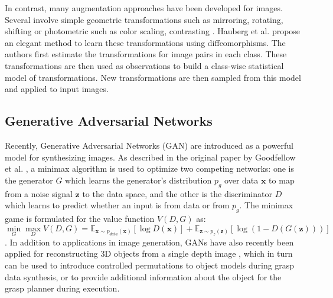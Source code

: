 In contrast, many augmentation approaches have been developed for images. Several involve simple geometric
transformations such as mirroring, rotating, shifting \cite{Gu2018} or photometric such as color scaling, contrasting
\cite{Eigen2015}. Hauberg et al. \cite{Hauberg2016Diffeomorphism} propose an elegant method to learn these
transformations using diffeomorphisms. The authors first estimate the transformations for image pairs in each class.
These transformations are then used as observations to build a class-wise statistical model of transformations.
New transformations are then sampled from this model and applied to input images.

\subsection{Generative Adversarial Networks}

Recently, Generative Adversarial Networks (GAN) are introduced as a powerful model for synthesizing images. As described
in the original paper by Goodfellow et al. \cite{Goodfellow2014GAN}, a minimax algorithm is used to optimize two
competing networks: one is the generator $ G $ which learns the generator's distribution $ p_g $ over data
$ \boldsymbol{x} $ to map from a noise signal $ \boldsymbol{z} $ to the data space, and the other is the discriminator
$ D $ which learns to predict whether an input is from data or from $ p_g $. The minimax game is formulated for the
value function $ V(D,G) $ as:
\begin{equation} \label{eq:gan}
    \min_G \max_D V(D,G) =
        \mathbb{E}_{\boldsymbol{x} \sim p_{data}(\boldsymbol{x})}\left[ \log D(\boldsymbol{x}) \right]
        + \mathbb{E}_{\boldsymbol{z} \sim p_{z}(\boldsymbol{z})}\left[ \log(1 - D(G(\boldsymbol{z}))) \right]
\end{equation}
. In addition to applications in image generation, GANs have also recently been applied for reconstructing 3D objects
from a single depth image \cite{Yang2017}, which in turn can be used to introduce controlled permutations to object
models during grasp data synthesis, or to provide additional information about the object for the grasp planner during
execution.

